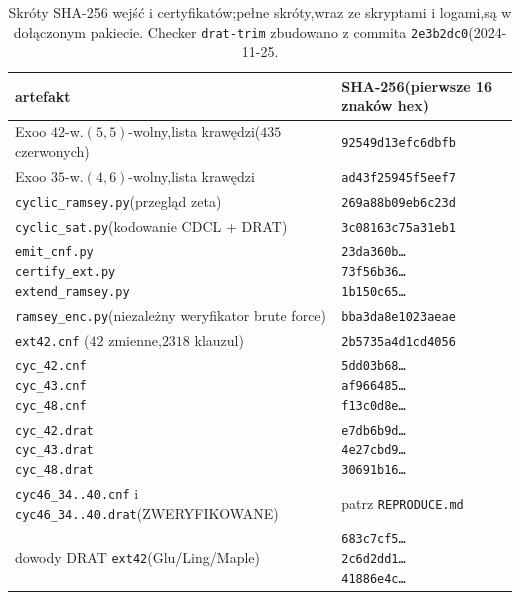 \documentclass[11pt]{article}
\theoremstyle{definition}
\theoremstyle{plain}
\begin{document}
\begin{table}[ht]\centering\small
\begin{tabular}{ll}
\toprule
artefakt & SHA-256(pierwsze 16 znaków hex) \\
\midrule
Exoo $42$-w.$(5,5)$-wolny,lista krawędzi($435$ czerwonych)&\texttt{92549d13efc6dbfb} \\
Exoo $35$-w.$(4,6)$-wolny,lista krawędzi&\texttt{ad43f25945f5eef7} \\
\texttt{cyclic\_ramsey.py}(przegląd zeta)&\texttt{269a88b09eb6c23d} \\
\texttt{cyclic\_sat.py}(kodowanie CDCL + DRAT)&\texttt{3c08163c75a31eb1} \\
\makecell[l]{\texttt{emit\_cnf.py} \\ \texttt{certify\_ext.py} \\ \texttt{extend\_ramsey.py}}&\makecell[l]{\texttt{23da360b\ldots} \\ \texttt{73f56b36\ldots} \\ \texttt{1b150c65\ldots}} \\
\texttt{ramsey\_enc.py}(niezależny weryfikator brute force)&\texttt{bba3da8e1023aeae} \\
\texttt{ext42.cnf} ($42$ zmienne,$2318$ klauzul)&\texttt{2b5735a4d1cd4056} \\
\makecell[l]{\texttt{cyc\_42.cnf} \\ \texttt{cyc\_43.cnf} \\ \texttt{cyc\_48.cnf}}&\makecell[l]{\texttt{5dd03b68\ldots} \\ \texttt{af966485\ldots} \\ \texttt{f13c0d8e\ldots}} \\
\makecell[l]{\texttt{cyc\_42.drat} \\ \texttt{cyc\_43.drat} \\ \texttt{cyc\_48.drat}}&\makecell[l]{\texttt{e7db6b9d\ldots} \\ \texttt{4e27cbd9\ldots} \\ \texttt{30691b16\ldots}} \\
\texttt{cyc46\_34..40.cnf} i \texttt{cyc46\_34..40.drat}(ZWERYFIKOWANE)&patrz \texttt{REPRODUCE.md} \\
dowody DRAT \texttt{ext42}(Glu/Ling/Maple)&\makecell[l]{\texttt{683c7cf5\ldots} \\ \texttt{2c6d2dd1\ldots} \\ \texttt{41886e4c\ldots}} \\
\bottomrule
\end{tabular}
\caption{Skróty SHA-256 wejść i certyfikatów;pełne skróty,wraz ze skryptami i logami,są w dołączonym pakiecie. Checker \texttt{drat-trim} zbudowano z commita \texttt{2e3b2dc0}(2024-11-25.}\label{tab:hashes}
\end{table}
\end{document}
